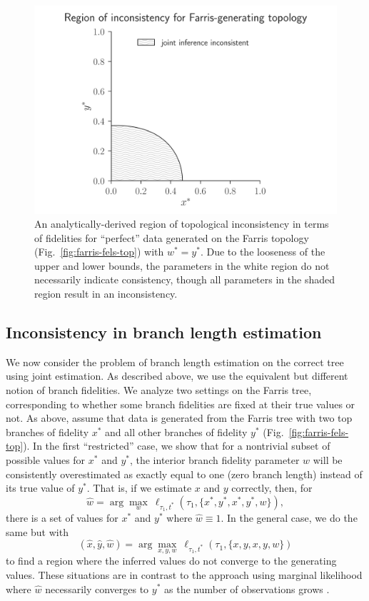 \documentclass{article}
\begin{document}
\begin{figure}
\centering
\includegraphics[width=\textwidth]{topology-inconsistency-inkscape}
\caption{
    An analytically-derived region of topological inconsistency in terms of fidelities for ``perfect'' data generated on the Farris topology (Fig.~\ref{fig:farris-fels-top}) with $w^* = y^*$.
    Due to the looseness of the upper and lower bounds, the parameters in the white region do not necessarily indicate consistency, though all parameters in the shaded region result in an inconsistency.
}
\label{fig:inconsistency-farris}
\end{figure}

\subsection*{Inconsistency in branch length estimation}

We now consider the problem of branch length estimation on the correct tree using joint estimation.
As described above, we use the equivalent but different notion of branch fidelities.
We analyze two settings on the Farris tree, corresponding to whether some branch fidelities are fixed at their true values or not.
As above, assume that data is generated from the Farris tree with two top branches of fidelity $x^*$ and all other branches of fidelity $y^*$ (Fig.~\ref{fig:farris-fels-top}).
In the first ``restricted'' case, we show that for a nontrivial subset of possible values for $x^*$ and $y^*$, the interior branch fidelity parameter $w$ will be consistently overestimated as exactly equal to one (zero branch length) instead of its true value of $y^*$.
That is, if we estimate $x$ and $y$ correctly, then, for
$$
\hat{w} = \arg\max_{w} \ \ell_{\tau_1,t^*}(\tau_1, \{x^*,y^*,x^*,y^*,w\}),
$$
there is a set of values for $x^*$ and $y^*$ where $\hat{w}\equiv 1$.
In the general case, we do the same but with
$$
(\hat{x}, \hat{y}, \hat{w}) = \arg\max_{x,y,w} \ \ell_{\tau_1,t^*}(\tau_1, \{x,y,x,y,w\})
$$
to find a region where the inferred values do not converge to the generating values.
These situations are in contrast to the approach using marginal likelihood where $\hat{w}$ necessarily converges to $y^*$ as the number of observations grows \cite{RoyChoudhury2015-ta}.
\end{document}
